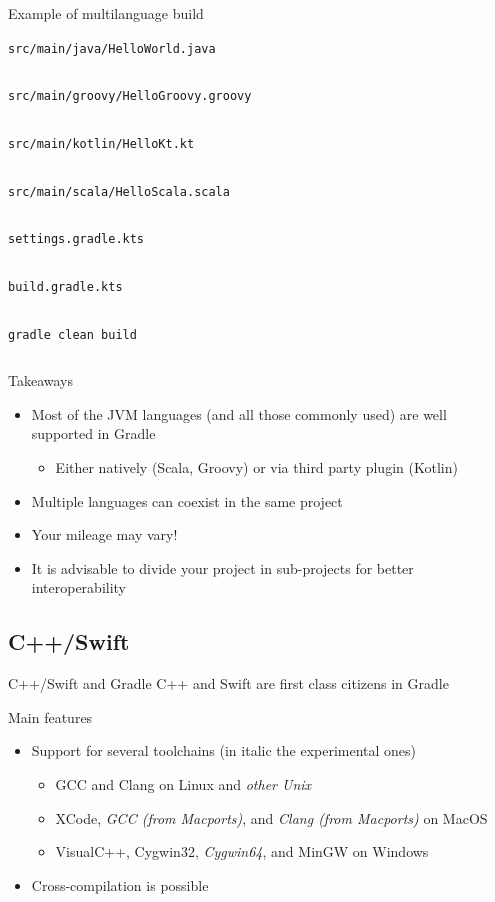 \documentclass[presentation]{beamer}
\newcommand{\codefile}[4]{
	\begin{block}{\texttt{#2}}
		\inputminted[fontsize=#3,linenos=true,breaklines=true]{#4}{"workspace/#1/#2"}
	\end{block}
}
\newcommand{\java}[3]{\codefile{#1}{#2}{#3}{java}}
\newcommand{\groovy}[3]{\codefile{#1}{#2}{#3}{groovy}}
\newcommand{\kotlin}[3]{\codefile{#1}{#2}{#3}{kotlin}}
\newcommand{\scala}[3]{\codefile{#1}{#2}{#3}{scala}}
\newcommand{\terminal}[3]{\codefile{#1}{#2}{#3}{text}}
\begin{document}
\begin{frame}{Example of multilanguage build}
    \java{16-Multilang}{src/main/java/HelloWorld.java}{\normalsize}
    \groovy{16-Multilang}{src/main/groovy/HelloGroovy.groovy}{\normalsize}
    \kotlin{16-Multilang}{src/main/kotlin/HelloKt.kt}{\normalsize}
    \scala{16-Multilang}{src/main/scala/HelloScala.scala}{\normalsize}
    \groovy{16-Multilang}{settings.gradle.kts}{\normalsize}
    \groovy{16-Multilang}{build.gradle.kts}{\footnotesize}
    \terminal{16-Multilang}{gradle clean build}{\tiny}
    \begin{block}{Takeaways}
        \begin{itemize}
            \item Most of the JVM languages (and all those commonly used) are well supported in Gradle
            \begin{itemize}
                \item Either natively (Scala, Groovy) or via third party plugin (Kotlin)
            \end{itemize}
            \item Multiple languages can coexist in the same project
            \item Your mileage may vary!
            \item It is advisable to divide your project in sub-projects for better interoperability
        \end{itemize}
    \end{block}
\end{frame}

\subsection{C++/Swift}

\begin{frame}[fragile]{C++/Swift and Gradle}
    C++ and Swift are first class citizens in Gradle
    \begin{block}{Main features}
        \begin{itemize}
            \item Support for several toolchains (in italic the experimental ones)
            \begin{itemize}
                \item GCC and Clang on Linux and \textit{other Unix}
                \item XCode, \textit{GCC (from Macports)}, and \textit{Clang (from Macports)} on MacOS
                \item VisualC++, Cygwin32, \textit{Cygwin64}, and MinGW on Windows
            \end{itemize}
            \item Cross-compilation is possible
        \end{itemize}
    \end{block}
\end{frame}
\end{document}
